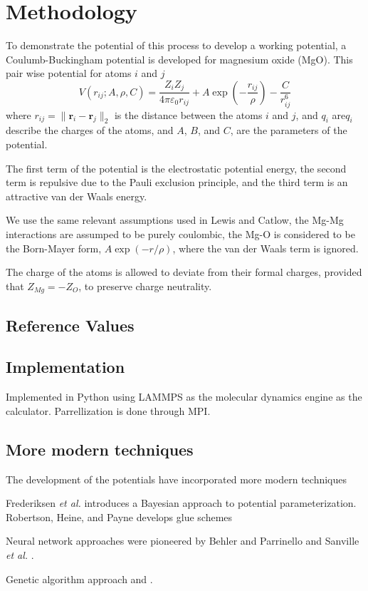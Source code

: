 \section{Methodology}
To demonstrate the potential of this process to develop a working potential, a Coulumb-Buckingham potential\cite{lewis1985_pot_buck_oxides} is developed for magnesium oxide (MgO).
This pair wise potential for atoms $i$ and $j$
\begin{equation}
    \label{eq:buck_eq}
    V(r_{ij};A,\rho,C)
        = \frac{Z_i Z_j}{4 \pi \varepsilon_0 r_{ij}}
            + A \exp(-\frac{r_{ij}}{\rho})
            - \frac{C}{r_{ij}^6}
\end{equation}
where $r_{ij} = \lVert \bm{r}_i - \bm{r}_j \rVert_2$ is the distance between the atoms $i$ and $j$, and $q_i$ are$q_i$ describe the charges of the atoms, and $A$, $B$, and $C$, are the parameters of the potential.

The first term of the potential is the electrostatic potential energy, the second term is repulsive due to the Pauli exclusion principle, and the third term is an attractive van der Waals energy.

We use the same relevant assumptions used in Lewis and Catlow\cite{lewis1985_pot_buck_oxides}, the Mg-Mg interactions are assumped to be purely coulombic, the Mg-O is considered to be the Born-Mayer form, $A \exp(-r/\rho)$, where the van der Waals term is ignored.

The charge of the atoms is allowed to deviate from their formal charges, provided that $Z_{Mg} = - Z_{O}$, to preserve charge neutrality.
\subsection{Reference Values}

\subsection{Implementation}
Implemented in Python using LAMMPS as the molecular dynamics engine as the calculator.  Parrellization is done through MPI.

\subsection{More modern techniques}
The development of the potentials have incorporated more modern techniques

Frederiksen \emph{et al.} \cite{fredericksen2004_bayesian_fitting} introduces a Bayesian approach to potential parameterization.
Robertson, Heine, and Payne \cite{robertson1993_glue_schemes} develops glue schemes

Neural network approaches were pioneered by Behler and Parrinello \cite{behler2007_NN_potdev} and Sanville \emph{et al.} \cite{sanville2008_NN_potdev_si}.

Genetic algorithm approach\cite{marques2008_ga_potdev} and \cite{hunger1998_ga_potdev}.
